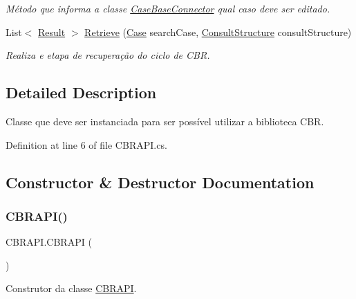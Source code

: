 \begin{DoxyCompactItemize}
\begin{DoxyCompactList}\small\item\em Método que informa a classe \hyperlink{class_case_base_connector}{Case\+Base\+Connector} qual caso deve ser editado. \end{DoxyCompactList}\item 
List$<$ \hyperlink{class_result}{Result} $>$ \hyperlink{class_c_b_r_a_p_i_af1992aae5101968f2a851f1ac1c044d7}{Retrieve} (\hyperlink{class_case}{Case} search\+Case, \hyperlink{class_consult_structure}{Consult\+Structure} consult\+Structure)
\begin{DoxyCompactList}\small\item\em Realiza e etapa de recuperação do ciclo de C\+BR. \end{DoxyCompactList}\end{DoxyCompactItemize}


\subsection{Detailed Description}
Classe que deve ser instanciada para ser possível utilizar a biblioteca C\+BR. 



Definition at line 6 of file C\+B\+R\+A\+P\+I.\+cs.



\subsection{Constructor \& Destructor Documentation}
\hypertarget{class_c_b_r_a_p_i_a6e4d8b523865ebbc550a50ff1785231b}{}\label{class_c_b_r_a_p_i_a6e4d8b523865ebbc550a50ff1785231b} 
\subsubsection{\texorpdfstring{C\+B\+R\+A\+P\+I()}{CBRAPI()}\hspace{0.1cm}{\footnotesize\ttfamily [1/2]}}
{\footnotesize\ttfamily C\+B\+R\+A\+P\+I.\+C\+B\+R\+A\+PI (\begin{DoxyParamCaption}{ }\end{DoxyParamCaption})}



Construtor da classe \hyperlink{class_c_b_r_a_p_i}{C\+B\+R\+A\+PI}. 



